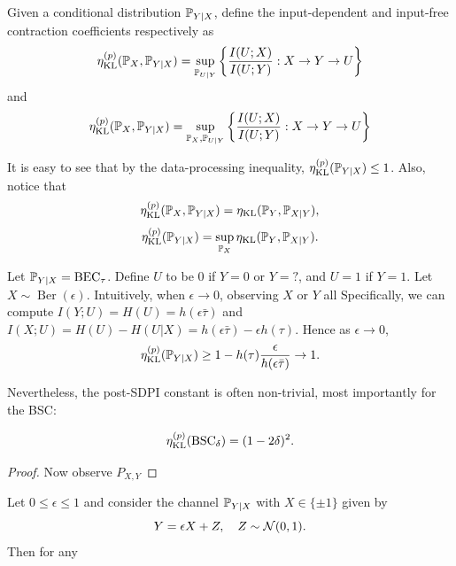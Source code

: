 \begin{definition}
    Given a conditional distribution $\mathbb{P}_{Y|X}$, define the input-dependent and input-free contraction coefficients respectively as
    \[\eta_{\operatorname{KL}}^{(p)}(\mathbb{P}_X,\mathbb{P}_{Y|X})=\sup_{\mathbb{P}_{U|Y}}\left\{\frac{I(U;X)}{I(U;Y)}:X\to Y\to U\right\}\]
    and
    \[\eta_{\operatorname{KL}}^{(p)}(\mathbb{P}_X,\mathbb{P}_{Y|X})=\sup_{\mathbb{P}_X,\mathbb{P}_{U|Y}}\left\{\frac{I(U;X)}{I(U;Y)}:X\to Y\to U\right\}\]
\end{definition}
It is easy to see that by the data-processing inequality, $\eta_{\operatorname{KL}}^{(p)}(\mathbb{P}_{Y|X})\leq 1$. Also, notice that 
\[\eta_{\operatorname{KL}}^{(p)}(\mathbb{P}_X,\mathbb{P}_{Y|X})=\eta_{\operatorname{KL}}(\mathbb{P}_Y,\mathbb{P}_{X|Y}),\]
\[\eta_{\operatorname{KL}}^{(p)}(\mathbb{P}_{Y|X})=\sup_{\mathbb{P}_X}\eta_{\operatorname{KL}}(\mathbb{P}_Y,\mathbb{P}_{X|Y}).\]

\begin{example}
    Let $\mathbb{P}_{Y|X}=\operatorname{BEC}_\tau$.
    Define $U$ to be $0$ if $Y=0$ or $Y=?$, and $U=1$ if $Y=1$.
    Let $X\sim\operatorname{Ber}(\epsilon)$.
    Intuitively, when $\epsilon\to 0$, observing $X$ or $Y$ all 
    Specifically, we can compute $I(Y;U)=H(U)=h(\epsilon\bar{\tau})$ and $I(X;U)=H(U)-H(U|X)=h(\epsilon\bar{\tau})-\epsilon h(\tau)$. Hence as $\epsilon\to 0$,
    \begin{align*}
        \eta_{\operatorname{KL}}^{(p)}(\mathbb{P}_{Y|X})\geq 1-h(\tau)\frac{\epsilon}{h(\epsilon\bar{\tau})}\to 1.
    \end{align*}
\end{example} 

Nevertheless, the post-SDPI constant is often non-trivial, most importantly for the BSC:
\begin{theorem}
    \[\eta_{\operatorname{KL}}^{(p)}(\operatorname{BSC}_\delta)=(1-2\delta)^2.\]
\end{theorem}
\begin{proof}
    Now observe $P_{X,Y}$ 
\end{proof}


\begin{theorem}
    Let $0\leq\epsilon \leq 1$ and consider the channel $\mathbb{P}_{Y|X}$ with $X\in\{\pm 1\}$ given by
    \[Y=\epsilon X+Z,\quad Z\sim\mathcal{N}(0,1).\]
    Then for any 
\end{theorem}